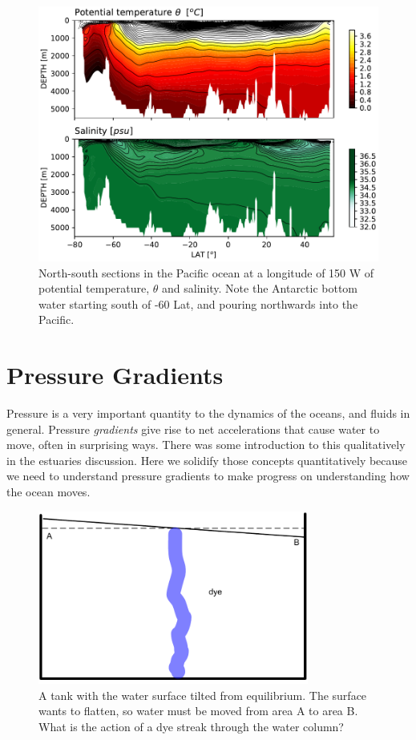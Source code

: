 \begin{figure}[hbt]
  \begin{center}
    \includegraphics[width=4.5in]{./figs/P16TempSalt.pdf}
    \caption{North-south sections in the Pacific ocean at a longitude of 150 W of potential temperature, $\theta$ and salinity. Note the Antarctic bottom water starting south of -60 Lat, and pouring northwards into the Pacific.}
    \label{fig:P16TempSalt}  
  \end{center}
\end{figure}


\section{Pressure Gradients}

Pressure is a very important quantity to the dynamics of the oceans,
and fluids in general.  Pressure \emph{gradients} give rise to net
accelerations that cause water to move, often in surprising ways.  There was some introduction to this qualitatively in the estuaries discussion.  Here we solidify those concepts quantitatively because we need to understand pressure gradients to make progress on understanding how the ocean moves.

\begin{figure}[htbp]
    \includegraphics[width=3.5in]{./figs/PGFig1.pdf}
    \caption{A tank with the water surface tilted from equilibrium.  The surface wants to flatten, so water must be moved from area A to area B.  What is the action of a dye streak through the water column?}
    \label{fig:PGFig1}
\end{figure}

